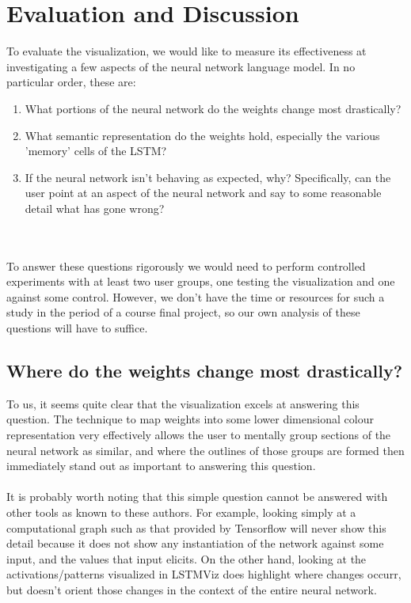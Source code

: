 \documentclass[journal]{vgtc}                %
\begin{document}
\section{Evaluation and Discussion}
To evaluate the visualization, we would like to measure its effectiveness at investigating a few aspects of the neural network language model.
In no particular order, these are:
\begin{enumerate}
    \item What portions of the neural network do the weights change most drastically?
    \item What semantic representation do the weights hold, especially the various 'memory' cells of the LSTM?
    \item If the neural network isn't behaving as expected, why?  Specifically, can the user point at an aspect of the neural network and say to some reasonable detail what has gone wrong?
\end{enumerate}
\\
\\
To answer these questions rigorously we would need to perform controlled experiments with at least two user groups, one testing the visualization and one against some control.
However, we don't have the time or resources for such a study in the period of a course final project, so our own analysis of these questions will have to suffice.

\subsection{Where do the weights change most drastically?}
To us, it seems quite clear that the visualization excels at answering this question.
The technique to map weights into some lower dimensional colour representation very effectively allows the user to mentally group sections of the neural network as similar, and where the outlines of those groups are formed then immediately stand out as important to answering this question.
\\
\\
It is probably worth noting that this simple question cannot be answered with other tools as known to these authors.
For example, looking simply at a computational graph such as that provided by Tensorflow will never show this detail because it does not show any instantiation of the network against some input, and the values that input elicits.
On the other hand, looking at the activations/patterns visualized in LSTMViz does highlight where changes occurr, but doesn't orient those changes in the context of the entire neural network.
\end{document}
